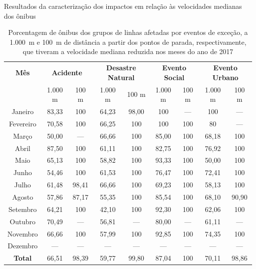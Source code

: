 \documentclass{beamer}
\begin{document}
\begin{frame}{Resultados da caracterização dos impactos em relação às velocidades medianas dos ônibus}
\begin{table}[!htb]
\centering
\caption {Porcentagem de ônibus dos grupos de linhas afetadas por eventos de exceção, a 1.000~m e 100~m de distância a partir dos pontos de parada, respectivamente, que tiveram a velocidade mediana reduzida nos meses do ano de 2017}
\label{tab:exceptEventVelocityImpAllStop}
\begin{adjustbox}{max height=10mm, width=3.5in}
\begin{tabular}{c|cc|cc|cc|cc}
\toprule
\textbf{Mês} & \multicolumn{2}{c}{\textbf{Acidente}} & \multicolumn{2}{c}{\textbf{Desastre Natural}} & \multicolumn{2}{c}{\textbf{Evento Social}} &
\multicolumn{2}{c}{\textbf{Evento Urbano}}\\
\cmidrule(l){2-3} \cmidrule(l){4-5} \cmidrule(l){6-7} \cmidrule(l){8-9}
 & 1.000 m & 100 m & 1.000 m & 100 m & 1.000 m & 100 m & 1.000 m & 100 m \\
\midrule
Janeiro & 83,33 &  100 & 
64,23 &  98,00 & 
100 & --- &
 100 & --- \\
\hline
Fevereiro & 70,58 &  100 &
 66,25 &  100 &
 100 & 100 &
 80 & --- \\
\hline
Março &  50,00 &  --- & 
66,66 &  100 &
85,00 & 100 &
68,18 & 100 \\
\hline
Abril & 87,50 &100 & 
 61,11 & 100 & 
 82,75 & 100 & 
 76,92 &  100 \\
\hline
Maio & 65,13 &  100 &
 58,82 &  100 &
 93,33 & 100 &
 50,00 & 100 \\
\hline
Junho & 54,46 &  100 &
 61,53 &  100 &
 76,47 & 100 &
 72,41 & 100 \\
\hline
Julho & 61,48 &  98,41 &
 66,66 & 100 &
 69,23 & 100 &
58,13 & 100 \\
\hline
Agosto & 57,86 & 87,17 &
 55,35 & 100 &
 85,54 & 100 & 
 68,10 & 90,90 \\
\hline
Setembro & 64,21 & 100 &
 42,10 & 100 &
 92,30 & 100 & 
 62,06 & 100 \\
\hline
Outubro & 70,49 & --- &
 56,81 & --- &
 80,00 & --- &
 61,11 & --- \\
\hline
Novembro & 66,66 & 100 &
 57,99 & 100 &
 92,85 & 100 &
 74,35 & 100 \\
\hline
Dezembro & --- & --- & --- & --- & --- & --- & --- & ---  \\
\midrule
\midrule
\textbf{Total} & 66,51 & 98,39 & 59,77 & 99,80 & 87,04 & 100 & 70,11 & 98,86  \\
\bottomrule
\end{tabular}
\end{adjustbox}
\end{table}
\end{frame}
\end{document}
